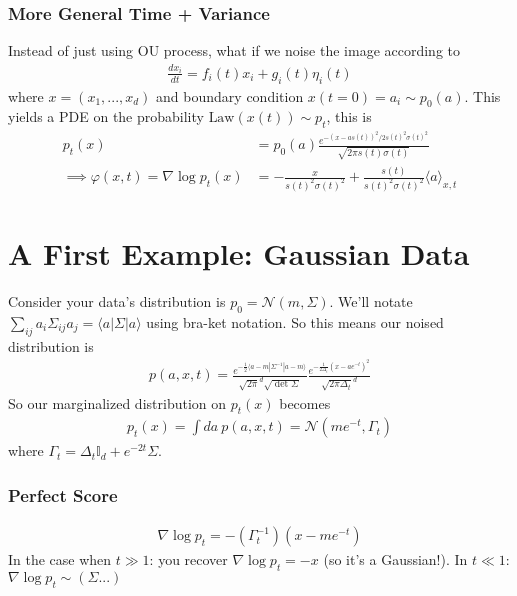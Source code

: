 \subsubsection{More General Time + Variance}
Instead of just using OU process, what if we noise the image according to
\begin{align}
	\frac{dx_i}{dt} = f_i(t) x_i + g_i(t) \eta_i(t)
\end{align}
where $x = (x_1, ..., x_d)$ and boundary condition $x(t=0) = a_i \sim p_0(a)$. This yields a PDE on the probability $\text{Law}(x(t)) \sim p_t$, this is
\begin{align}
	p_t(x) & =  p_0(a) \frac{e^{-(x - a s(t))^2/ 2s(t)^2 \sigma(t)^2}}{\sqrt{2 \pi s(t) \sigma(t)}}\\
	\implies \varphi(x,t) = \nabla \log p_t(x) & =  - \frac{x}{s(t)^2 \sigma(t)^2} + \frac{s(t)}{s(t)^2 \sigma(t)^2} \langle a \rangle_{x,t}
\end{align}


\section{A First Example: Gaussian Data}
Consider your data's distribution is $p_0 = \mathcal N(m, \Sigma)$. We'll notate $\sum_{ij} a_i \Sigma_{ij}a_j = \langle a | \Sigma | a \rangle$ using bra-ket notation.  So this means our noised distribution is
\begin{align}
	p(a,x,t) = \frac{e^{-\frac{1}{2} \langle a-m  | \Sigma^{-1}  | a - m \rangle}}{\sqrt{2\pi}^d \sqrt{\det \Sigma}} \frac{e^{-\frac{1}{2 \Delta_t}(x - ae^{-t})^2 }}{\sqrt{2\pi \Delta_t}^d}
\end{align}
So our marginalized distribution on $p_t(x)$ becomes
\begin{align}
	p_t(x) = \int da~ p(a,x,t)= \mathcal N(m e^{-t}, \Gamma_t)
\end{align}
where $\Gamma_t = \Delta_t \mathbb I_d + e^{-2t} \Sigma$. 
\subsubsection{Perfect Score}
\begin{align}
	\nabla \log p_t = - (\Gamma_t^{-1})(x - m e^{-t})
\end{align}
In the case when $t \gg 1$: you recover $\nabla \log p_t = -x$ (so it's a Gaussian!). In $t \ll 1$: $\nabla \log p_t \sim (\Sigma...)$ 

